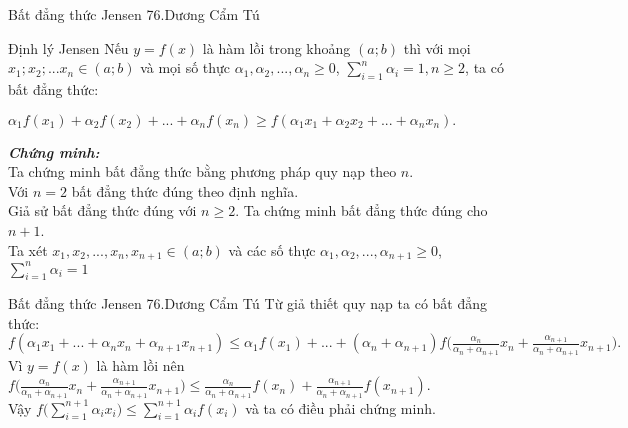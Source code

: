 \begin{frame}{{Bất đẳng thức Jensen} \hspace{6.5cm} 76.Dương Cẩm Tú} 
\begin{block}{Định lý Jensen}
            Nếu $y=f(x)$ là hàm lồi trong khoảng $(a;b)$ thì với mọi $x_1;x_2;...x_n \in (a;b)$ và mọi số thực $\alpha_1,\alpha_2,..., \alpha_n\geq0$, $\displaystyle \sum_{i=1}^{n}\alpha_i=1,n\geq2$, ta có bất đẳng thức:
        \begin{center}
                $\alpha_1 f(x_1)+\alpha_2 f(x_2)+...+ \alpha_n f(x_n)\geq f(\alpha_1 x_1+\alpha_2 x_2+...+ \alpha_n x_n).$
        \end{center}
\end{block} 
\pause 
\textbf {\textit{Chứng minh:}}\\
\pause 
Ta chứng minh bất đẳng thức bằng phương pháp quy nạp theo $n$.\\
\pause 
\vspace{0,25cm}
Với $n=2$ bất đẳng thức đúng theo định nghĩa.\\
\pause 
\vspace{0,25cm}
Giả sử bất đẳng thức đúng với $n\geq2$. Ta chứng minh bất đẳng thức đúng cho $n+1$.\\
\pause 
Ta xét $x_1,x_2,...,x_n,x_{n+1}\in(a;b)$ và các số thực $\alpha_1,\alpha_2,..., \alpha_{n+1}\geq0$, $\displaystyle \sum_{i=1}^{n}\alpha_i=1$
\end{frame}
\begin{frame}{{Bất đẳng thức Jensen} \hspace{6.5cm} 76.Dương Cẩm Tú} 
Từ giả thiết quy nạp ta có bất đẳng thức:\\
\pause 
\vspace{0,25cm}
$f(\alpha_1 x_1+...+ \alpha_n x_n+\alpha_{n+1} x_{n+1}) \leq \alpha_1 f(x_1)+...+ (\alpha_n+\alpha_{n+1}) f\Big(\displaystyle\frac{\alpha_n}{\alpha_n+\alpha_{n+1}}x_n+\displaystyle\frac{\alpha_{n+1}}{\alpha_n+\alpha_{n+1}}x_{n+1}\Big).$\\
\pause 
\vspace{0,5cm}
Vì $y=f(x)$ là hàm lồi nên\\
\vspace{0,5cm}
$f\Big(\displaystyle\frac{\alpha_n}{\alpha_n+\alpha_{n+1}}x_n+\displaystyle\frac{\alpha_{n+1}}{\alpha_n+\alpha_{n+1}}x_{n+1}\Big) \leq \displaystyle\frac{\alpha_n}{\alpha_n+\alpha_{n+1}} f(x_n)+ \displaystyle\frac{\alpha_{n+1}}{\alpha_n+\alpha_{n+1}} f(x_{n+1})$.\\
\vspace{0,5cm}
\pause 
Vậy $f\Big(\displaystyle\sum_{i=1}^{n+1}\alpha_i x_i\Big)\leq \sum_{i=1}^{n+1}\alpha_if(x_i)$ và ta có điều phải chứng minh.
\end{frame}
